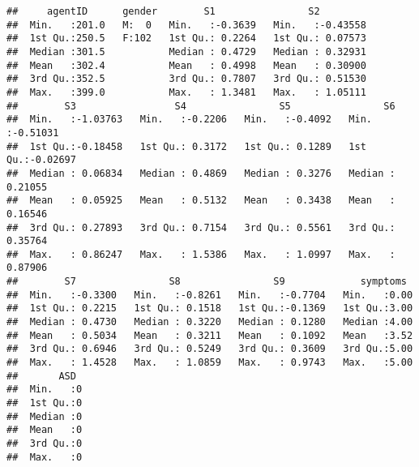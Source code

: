 \documentclass[]{article}
\begin{document}
\begin{verbatim}
##     agentID      gender        S1                S2          
##  Min.   :201.0   M:  0   Min.   :-0.3639   Min.   :-0.43558  
##  1st Qu.:250.5   F:102   1st Qu.: 0.2264   1st Qu.: 0.07573  
##  Median :301.5           Median : 0.4729   Median : 0.32931  
##  Mean   :302.4           Mean   : 0.4998   Mean   : 0.30900  
##  3rd Qu.:352.5           3rd Qu.: 0.7807   3rd Qu.: 0.51530  
##  Max.   :399.0           Max.   : 1.3481   Max.   : 1.05111  
##        S3                 S4                S5                S6          
##  Min.   :-1.03763   Min.   :-0.2206   Min.   :-0.4092   Min.   :-0.51031  
##  1st Qu.:-0.18458   1st Qu.: 0.3172   1st Qu.: 0.1289   1st Qu.:-0.02697  
##  Median : 0.06834   Median : 0.4869   Median : 0.3276   Median : 0.21055  
##  Mean   : 0.05925   Mean   : 0.5132   Mean   : 0.3438   Mean   : 0.16546  
##  3rd Qu.: 0.27893   3rd Qu.: 0.7154   3rd Qu.: 0.5561   3rd Qu.: 0.35764  
##  Max.   : 0.86247   Max.   : 1.5386   Max.   : 1.0997   Max.   : 0.87906  
##        S7                S8                S9             symptoms   
##  Min.   :-0.3300   Min.   :-0.8261   Min.   :-0.7704   Min.   :0.00  
##  1st Qu.: 0.2215   1st Qu.: 0.1518   1st Qu.:-0.1369   1st Qu.:3.00  
##  Median : 0.4730   Median : 0.3220   Median : 0.1280   Median :4.00  
##  Mean   : 0.5034   Mean   : 0.3211   Mean   : 0.1092   Mean   :3.52  
##  3rd Qu.: 0.6946   3rd Qu.: 0.5249   3rd Qu.: 0.3609   3rd Qu.:5.00  
##  Max.   : 1.4528   Max.   : 1.0859   Max.   : 0.9743   Max.   :5.00  
##       ASD   
##  Min.   :0  
##  1st Qu.:0  
##  Median :0  
##  Mean   :0  
##  3rd Qu.:0  
##  Max.   :0
\end{verbatim}
\end{document}
